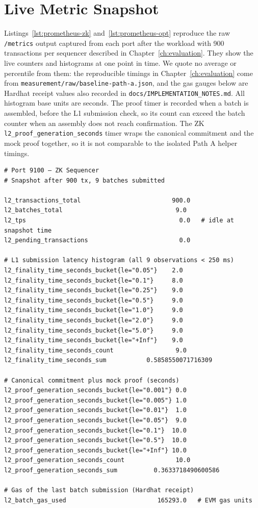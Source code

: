 \section{Live Metric Snapshot}

Listings~\ref{lst:prometheus-zk} and~\ref{lst:prometheus-opt} reproduce the raw \texttt{/metrics} output captured from each port after the workload with 900 transactions per sequencer described in Chapter~\ref{ch:evaluation}. They show the live counters and histograms at one point in time. We quote no average or percentile from them: the reproducible timings in Chapter~\ref{ch:evaluation} come from \texttt{measurement/raw/baseline-path-a.json}, and the gas gauges below are Hardhat receipt values also recorded in \texttt{docs/IMPLEMENTATION\_NOTES.md}. All histogram base units are seconds. The proof timer is recorded when a batch is assembled, before the L1 submission check, so its count can exceed the batch counter when an assembly does not reach confirmation. The ZK \texttt{l2\_proof\_generation\_seconds} timer wraps the canonical commitment and the mock proof together, so it is not comparable to the isolated Path A helper timings.

\begin{listing}[H]
\begin{verbatim}
# Port 9100 — ZK Sequencer
# Snapshot after 900 tx, 9 batches submitted

l2_transactions_total                         900.0
l2_batches_total                               9.0
l2_tps                                          0.0   # idle at snapshot time
l2_pending_transactions                         0.0

# L1 submission latency histogram (all 9 observations < 250 ms)
l2_finality_time_seconds_bucket{le="0.05"}    2.0
l2_finality_time_seconds_bucket{le="0.1"}     8.0
l2_finality_time_seconds_bucket{le="0.25"}    9.0
l2_finality_time_seconds_bucket{le="0.5"}     9.0
l2_finality_time_seconds_bucket{le="1.0"}     9.0
l2_finality_time_seconds_bucket{le="2.0"}     9.0
l2_finality_time_seconds_bucket{le="5.0"}     9.0
l2_finality_time_seconds_bucket{le="+Inf"}    9.0
l2_finality_time_seconds_count                 9.0
l2_finality_time_seconds_sum           0.5858550071716309

# Canonical commitment plus mock proof (seconds)
l2_proof_generation_seconds_bucket{le="0.001"} 0.0
l2_proof_generation_seconds_bucket{le="0.005"} 1.0
l2_proof_generation_seconds_bucket{le="0.01"}  1.0
l2_proof_generation_seconds_bucket{le="0.05"}  9.0
l2_proof_generation_seconds_bucket{le="0.1"}  10.0
l2_proof_generation_seconds_bucket{le="0.5"}  10.0
l2_proof_generation_seconds_bucket{le="+Inf"} 10.0
l2_proof_generation_seconds_count              10.0
l2_proof_generation_seconds_sum          0.3633718490600586

# Gas of the last batch submission (Hardhat receipt)
l2_batch_gas_used                         165293.0   # EVM gas units
\end{verbatim}
\caption{ZK metrics snapshot}
\label{lst:prometheus-zk}
\end{listing}

